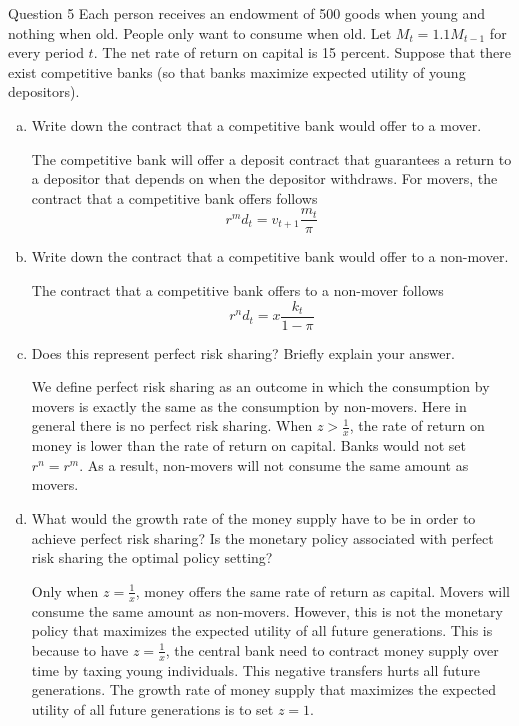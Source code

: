 \documentclass[a4paper]{article}
\newif\IfInSansMode
\numberwithin{equation}{section}
\numberwithin{figure}{section}
\begin{document}
	\begin{questionbox}{Question 5}
		Each person receives an endowment of 500 goods when young and nothing when old. People only want to consume when old. Let \( M_t = 1.1M_{t-1} \) for every period \( t \). The net rate of return on capital is 15 percent. Suppose that there exist competitive banks (so that banks maximize expected utility of young depositors).
		\begin{enumerate}[(a)]
			\item Write down the contract that a competitive bank would offer to a mover.
			\begin{explanationbox}
				The competitive bank will offer a deposit contract that guarantees a return to a depositor that depends on when the depositor withdraws. For movers, the contract that a competitive bank offers follows
				\[
					r^md_t = v_{t+1}\frac{m_t}{\pi}
				\]
			\end{explanationbox}
			\item Write down the contract that a competitive bank would offer to a non-mover.
			\begin{explanationbox}
				The contract that a competitive bank offers to a non-mover follows
				\[
					r^nd_t = x\frac{k_t}{1-\pi}
				\]
			\end{explanationbox}
			\item Does this represent perfect risk sharing? Briefly explain your answer.
			\begin{explanationbox}
				We define perfect risk sharing as an outcome in which the consumption by movers is exactly the same as the consumption by non-movers. Here in general there is no perfect risk sharing. When \( z > \frac{1}{x} \), the rate of return on money is lower than the rate of return on capital. Banks would not set \( r^n = r^m \). As a result, non-movers will not consume the same amount as movers.
			\end{explanationbox}
			\item What would the growth rate of the money supply have to be in order to achieve perfect risk sharing? Is the monetary policy associated with perfect risk sharing the optimal policy setting?
			\begin{explanationbox}
				Only when \( z = \frac{1}{x} \), money offers the same rate of return as capital. Movers will consume the same amount as non-movers. However, this is not the monetary policy that maximizes the expected utility of all future generations. This is because to have \( z = \frac{1}{x} \), the central bank need to contract money supply over time by taxing young individuals. This negative transfers hurts all future generations. The growth rate of money supply that maximizes the expected utility of all future generations is to set \( z = 1 \).
			\end{explanationbox}
		\end{enumerate}
	\end{questionbox}
\end{document}
